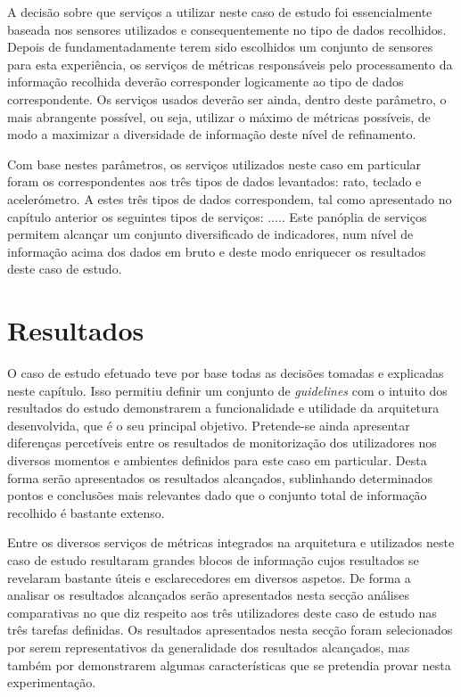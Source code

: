 A decisão sobre que serviços a utilizar neste caso de estudo foi essencialmente baseada nos sensores utilizados e consequentemente no tipo de dados recolhidos. Depois de fundamentadamente terem sido escolhidos um conjunto de sensores para esta experiência, os serviços de métricas responsáveis pelo processamento da informação recolhida deverão corresponder logicamente ao tipo de dados correspondente. Os serviços usados deverão ser ainda, dentro deste parâmetro, o mais abrangente possível, ou seja, utilizar o máximo de métricas possíveis, de modo a maximizar a diversidade de informação deste nível de refinamento.

Com base nestes parâmetros, os serviços utilizados neste caso em particular foram os correspondentes aos três tipos de dados levantados: rato, teclado e acelerómetro. A estes três tipos de dados correspondem, tal como apresentado no capítulo anterior os seguintes tipos de serviços: ..... Este panóplia de serviços permitem alcançar um conjunto diversificado de indicadores, num nível de informação acima dos dados em bruto e deste modo enriquecer os resultados deste caso de estudo. 

\section{Resultados}

O caso de estudo efetuado teve por base todas as decisões tomadas e explicadas neste capítulo. Isso permitiu definir um conjunto de \textit{guidelines} com o intuito dos resultados do estudo demonstrarem a funcionalidade e utilidade da arquitetura desenvolvida, que é o seu principal objetivo. Pretende-se ainda apresentar diferenças percetíveis entre os resultados de monitorização dos utilizadores nos diversos momentos e ambientes definidos para este caso em particular. Desta forma serão apresentados os resultados alcançados, sublinhando determinados pontos e conclusões mais relevantes dado que o conjunto total de informação recolhido é bastante extenso.

Entre os diversos serviços de métricas integrados na arquitetura e utilizados neste caso de estudo resultaram grandes blocos de informação cujos resultados se revelaram bastante úteis e esclarecedores em diversos aspetos. De forma a analisar os resultados alcançados serão apresentados nesta secção análises comparativas no que diz respeito aos três utilizadores deste caso de estudo nas três tarefas definidas. Os resultados apresentados nesta secção foram selecionados por serem representativos da generalidade dos resultados alcançados, mas também por demonstrarem algumas características que se pretendia provar nesta experimentação.

